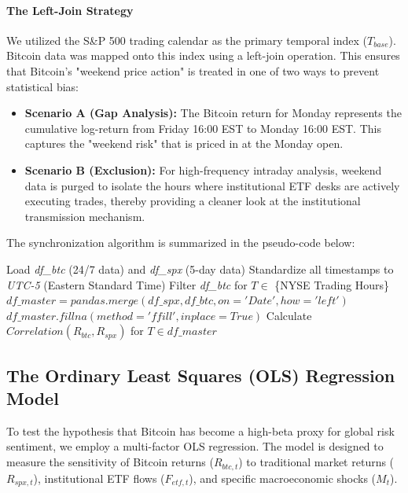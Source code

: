 \documentclass[10pt, conference, compsocconf]{IEEEtran}
\begin{document}
\paragraph{The Left-Join Strategy}
We utilized the S\&P 500 trading calendar as the primary temporal index ($T_{base}$). Bitcoin data was mapped onto this index using a left-join operation. This ensures that Bitcoin's "weekend price action" is treated in one of two ways to prevent statistical bias:
\begin{itemize}
    \item \textbf{Scenario A (Gap Analysis):} The Bitcoin return for Monday represents the cumulative log-return from Friday 16:00 EST to Monday 16:00 EST. This captures the "weekend risk" that is priced in at the Monday open.
    \item \textbf{Scenario B (Exclusion):} For high-frequency intraday analysis, weekend data is purged to isolate the hours where institutional ETF desks are actively executing trades, thereby providing a cleaner look at the institutional transmission mechanism.
\end{itemize}

The synchronization algorithm is summarized in the pseudo-code below:

\begin{algorithmic}[1]
\STATE Load \textit{df\_btc} (24/7 data) and \textit{df\_spx} (5-day data)
\STATE Standardize all timestamps to \textit{UTC-5} (Eastern Standard Time)
\STATE Filter \textit{df\_btc} for $T \in$ \{NYSE Trading Hours\}
\STATE $df\_master = pandas.merge(df\_spx, df\_btc, on='Date', how='left')$
\STATE $df\_master.fillna(method='ffill', inplace=True)$
\STATE Calculate $Correlation(R_{btc}, R_{spx})$ for $T \in df\_master$
\end{algorithmic}


\subsection{The Ordinary Least Squares (OLS) Regression Model}

To test the hypothesis that Bitcoin has become a high-beta proxy for global risk sentiment, we employ a multi-factor OLS regression. The model is designed to measure the sensitivity of Bitcoin returns ($R_{btc,t}$) to traditional market returns ($R_{spx,t}$), institutional ETF flows ($F_{etf,t}$), and specific macroeconomic shocks ($M_t$).
\end{document}
